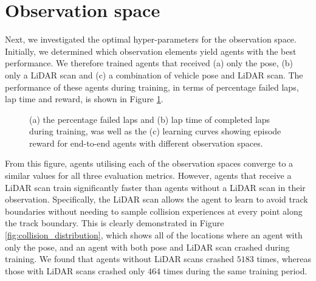 
\section{Observation space}\label{sec:obs_space}

Next, we investigated the optimal hyper-parameters for the observation space.
Initially, we determined which observation elements yield agents with the best performance.
We therefore trained agents that received (a) only the pose, (b) only a LiDAR scan and (c) a combination of vehicle pose and LiDAR scan.
The performance of these agents during training, in terms of percentage failed laps, lap time and reward, is shown in Figure \ref{fig:obs_space}.

\begin{figure}[htb!]
    \centering
    
    \caption[Learning curves of agents with different observation spaces]{(a) the percentage failed laps and (b) lap time of completed laps during training, was well as the (c) learning curves showing episode reward for end-to-end agents with different observation spaces.}
    \label{fig:obs_space}
\end{figure}

From this figure, agents utilising each of the observation spaces converge to a similar values for all three evaluation metrics.
However, agents that receive a LiDAR scan train significantly faster than agents without a LiDAR scan in their observation.
Specifically, the LiDAR scan allows the agent to learn to avoid track boundaries without needing to sample collision experiences at every point along the track boundary.
This is clearly demonstrated in Figure \ref{fig:collision_distribution}, which shows all of the locations where an agent with only the pose, and an agent with both pose and LiDAR scan crashed during training.
We found that agents without LiDAR scans crashed $5183$ times, whereas those with LiDAR scans crashed only $464$ times during the same training period.

